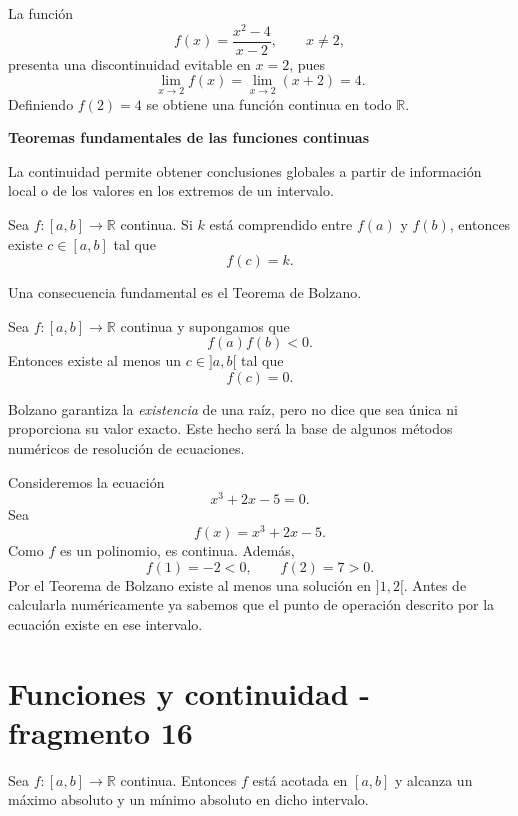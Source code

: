 \begin{example}
La función
\[
f(x)=\frac{x^2-4}{x-2},\qquad x\neq2,
\]
presenta una discontinuidad evitable en $x=2$, pues
\[
\lim_{x\to2}f(x)=\lim_{x\to2}(x+2)=4.
\]
Definiendo $f(2)=4$ se obtiene una función continua en todo $\mathbb{R}$.
\end{example}

\textbf{Teoremas fundamentales de las funciones continuas}

La continuidad permite obtener conclusiones globales a partir de información local o de los valores en los extremos de un intervalo.

\begin{theorem}
Sea $f:[a,b]\to\mathbb{R}$ continua. Si $k$ está comprendido entre $f(a)$ y $f(b)$, entonces existe $c\in[a,b]$ tal que
\[
f(c)=k.
\]
\end{theorem}

Una consecuencia fundamental es el Teorema de Bolzano.

\begin{theorem}
Sea $f:[a,b]\to\mathbb{R}$ continua y supongamos que
\[
f(a)f(b)<0.
\]
Entonces existe al menos un $c\in]a,b[$ tal que
\[
f(c)=0.
\]
\end{theorem}

Bolzano garantiza la \emph{existencia} de una raíz, pero no dice que sea única ni proporciona su valor exacto. Este hecho será la base de algunos métodos numéricos de resolución de ecuaciones.

\begin{example}
Consideremos la ecuación
\[
x^3+2x-5=0.
\]
Sea
\[
f(x)=x^3+2x-5.
\]
Como $f$ es un polinomio, es continua. Además,
\[
f(1)=-2<0,
\qquad
f(2)=7>0.
\]
Por el Teorema de Bolzano existe al menos una solución en $]1,2[$. Antes de calcularla numéricamente ya sabemos que el punto de operación descrito por la ecuación existe en ese intervalo.
\end{example}


\section{Funciones y continuidad - fragmento 16}
\begin{theorem}
Sea $f:[a,b]\to\mathbb{R}$ continua. Entonces $f$ está acotada en $[a,b]$ y alcanza un máximo absoluto y un mínimo absoluto en dicho intervalo.
\end{theorem}

